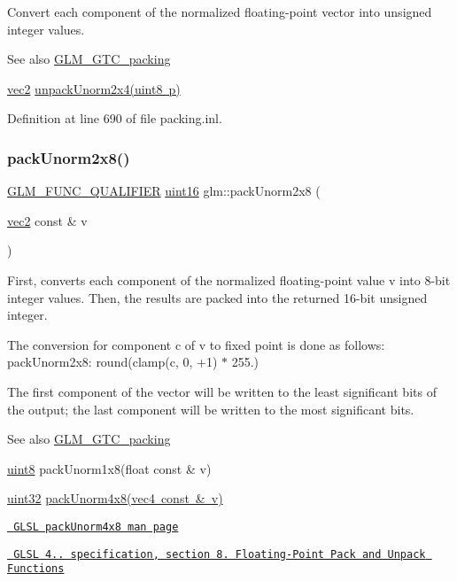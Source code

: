 Convert each component of the normalized floating-\/point vector into unsigned integer values.

\begin{DoxySeeAlso}{See also}
\mbox{\hyperlink{group__gtc__packing}{G\+L\+M\+\_\+\+G\+T\+C\+\_\+packing}} 

\mbox{\hyperlink{group__core__types_gaa1618f51db67eaa145db101d8c8431d8}{vec2}} \mbox{\hyperlink{group__gtc__packing_ga3afb0452954320f2d83fe6f38cb24147}{unpack\+Unorm2x4(uint8 p)}} 
\end{DoxySeeAlso}


Definition at line 690 of file packing.\+inl.

\mbox{\label{group__gtc__packing_ga833288fc0d4a79f19d0db75a6843bfe6}} 
\subsubsection{\texorpdfstring{packUnorm2x8()}{packUnorm2x8()}}
{\footnotesize\ttfamily \mbox{\hyperlink{setup_8hpp_a33fdea6f91c5f834105f7415e2a64407}{G\+L\+M\+\_\+\+F\+U\+N\+C\+\_\+\+Q\+U\+A\+L\+I\+F\+I\+ER}} \mbox{\hyperlink{group__gtc__type__precision_gad8c2939e1fdd8e5828b31d95c52255d5}{uint16}} glm\+::pack\+Unorm2x8 (\begin{DoxyParamCaption}\item[{\mbox{\hyperlink{group__core__types_gaa1618f51db67eaa145db101d8c8431d8}{vec2}} const \&}]{v }\end{DoxyParamCaption})}

First, converts each component of the normalized floating-\/point value v into 8-\/bit integer values. Then, the results are packed into the returned 16-\/bit unsigned integer.

The conversion for component c of v to fixed point is done as follows\+: pack\+Unorm2x8\+: round(clamp(c, 0, +1) $\ast$ 255.)

The first component of the vector will be written to the least significant bits of the output; the last component will be written to the most significant bits.

\begin{DoxySeeAlso}{See also}
\mbox{\hyperlink{group__gtc__packing}{G\+L\+M\+\_\+\+G\+T\+C\+\_\+packing}} 

\mbox{\hyperlink{group__gtc__type__precision_ga1a7dcd8aac97cc8020817c94049deff2}{uint8}} pack\+Unorm1x8(float const \& v) 

\mbox{\hyperlink{group__gtc__type__precision_ga202b6a53c105fcb7e531f9b443518451}{uint32}} \mbox{\hyperlink{group__core__func__packing_ga834ee9a9e73dcb0a7c1fc88143f3edb8}{pack\+Unorm4x8(vec4 const \& v)}} 

\href{http://www.opengl.org/sdk/docs/manglsl/xhtml/packUnorm4x8.xml}{\texttt{ G\+L\+SL pack\+Unorm4x8 man page}} 

\href{http://www.opengl.org/registry/doc/GLSLangSpec.4.20.8.pdf}{\texttt{ G\+L\+SL 4.. specification, section 8. Floating-\/\+Point Pack and Unpack Functions}} 
\end{DoxySeeAlso}


